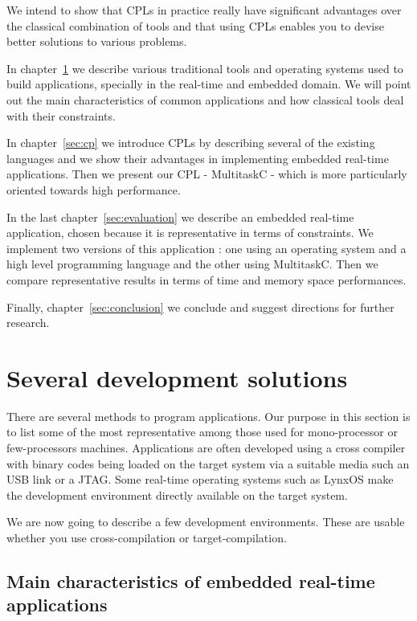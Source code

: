 \documentclass[10pt]{report}
\begin{document}
We intend to show that CPLs in practice really have significant 
advantages over the classical combination of tools and that using 
CPLs enables you to devise better solutions to various problems.

In chapter~\ref{sec:related} we describe various traditional tools 
and operating systems used to build applications, specially in 
the real-time and embedded domain. We will point out the main 
characteristics of common applications and how classical tools 
deal with their constraints.

In chapter~\ref{sec:cp}  we introduce CPLs by describing several of 
the existing languages and we show their advantages in 
implementing embedded real-time applications. Then we present our 
CPL - MultitaskC - which is more particularly oriented towards 
high performance.

In the last chapter~\ref{sec:evaluation} we describe an embedded 
real-time application, chosen because it is representative in 
terms of constraints. We implement two versions of this 
application : one using an operating system and a 
high level programming language and the other using MultitaskC. 
Then we compare representative results in terms of time and 
memory space performances.

Finally, chapter~\ref{sec:conclusion} we conclude and suggest 
directions for further research.

\chapter{Several development solutions}
\label{sec:related}

There are several methods to program applications. Our purpose in 
this section is to list some of the most representative among 
those used for mono-processor or few-processors machines. 
Applications are often developed using a cross compiler with 
binary codes being loaded on the target system via a suitable 
media such an USB link or a JTAG. Some real-time operating 
systems such as LynxOS make the development environment directly 
available on the target system.

We are now going to describe a few development environments. 
These are usable whether you use cross-compilation or 
target-compilation.

\section{Main characteristics of embedded real-time applications}
\end{document}
